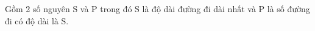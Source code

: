 Gồm 2 số nguyên S và P trong đó S là độ dài đường đi dài nhất và P là số đường đi có độ dài là S.  

\